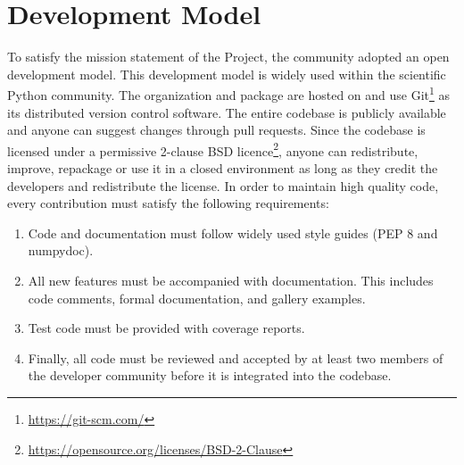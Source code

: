 \section{Development Model}

To satisfy the mission statement of the Project, the \sunpy community adopted an open development model.
This development model is widely used within the scientific Python community.
The \sunpy organization and \sunpypkg package are hosted on \github and use Git\footnote{\url{https://git-scm.com/}} as its distributed version control software.
The entire codebase is publicly available and anyone can suggest changes through pull requests.
Since the codebase is licensed under a permissive 2-clause BSD licence\footnote{\url{https://opensource.org/licenses/BSD-2-Clause}}, anyone can redistribute, improve, repackage or use it in a closed environment as long as they credit the \sunpy developers and redistribute the license.
In order to maintain high quality code, every contribution must satisfy the following requirements:
\begin{enumerate}
    \item Code and documentation must follow widely used style guides (PEP 8 and numpydoc).
    \item All new features must be accompanied with documentation.
    This includes code comments, formal documentation, and gallery examples.
    \item Test code must be provided with coverage reports.
    \item Finally, all code must be reviewed and accepted by at least two members of the developer community before it is integrated into the codebase.
\end{enumerate}

